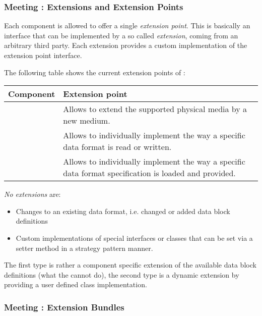 
\subsubsection{Meeting \REQUextClearlyDefinedExtensibility{}: Extensions and Extension Points}
\label{sec:ExtensionsAndExtensionPoints}

Each \LibName{} component is allowed to offer a single \emph{extension point}. This is basically an interface that can be implemented by a so called \emph{extension}, coming from an arbitrary third party. Each extension provides a custom implementation of the extension point interface.

The following table shows the current extension points of \LibName{}:

\begin{longtable}{|p{}|p{}|}
	\hline
	Component & Extension point \\
	\endhead
		\hline
	\COMPmedia{} & Allows to extend the supported physical media by a new medium.\\
	\hline
	\COMPdataPartManagement{} & Allows to individually implement the way a specific data format is read or written.\\
	\hline
	\COMPdataFormatManagement{} & Allows to individually implement the way a specific data format specification is loaded and provided.\\
	\hline
\end{longtable}

\emph{No extensions} are:
\begin{itemize}
	\item Changes to an existing data format, i.e. changed or added data block definitions
	\item Custom implementations of special \LibName{} interfaces or classes that can be set via a setter method in a strategy pattern manner.
\end{itemize}

The first type is rather a component specific extension of the available data block definitions (what the \ACTORextender{} cannot do), the second type is a dynamic extension by providing a user defined class implementation. 


\subsubsection{Meeting \REQUextEasyDeployment{}: Extension Bundles}
\label{sec:ExtensionBundles}

